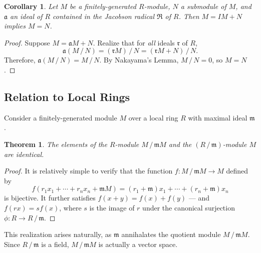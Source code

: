 \documentclass[11pt]{article}
\newtheorem{theorem}{Theorem}
\newtheorem{corollary}{Corollary}
\begin{document}
\begin{adjustwidth}{1cm}{}
	\begin{corollary}
		Let $M$ be a finitely-generated $R$-module, $N$ a submodule of $M$, and $\mathfrak{a}$ an ideal of $R$ contained in the Jacobson radical $\mathfrak{R}$ of $R$. Then $M = IM + N$ implies $M = N$.
	\end{corollary}
	\begin{proof}
		Suppose $M = \mathfrak{a} M + N$. Realize that for \textit{all} ideals $\mathfrak{r}$ of $R$,
		\[
			\mathfrak{a}(M \,/\, N) = (\mathfrak{r}M) \,/\, N = (\mathfrak{r}M + N) \,/\, N.
		\]
		Therefore, $\mathfrak{a}(M \,/\, N) = M \,/\, N$. By Nakayama's Lemma, $M \,/\, N = 0$, so $M = N$.
	\end{proof}
\end{adjustwidth}


\subsection{Relation to Local Rings}

Consider a finitely-generated module $M$ over a local ring $R$ with maximal ideal $\mathfrak{m}$. 

\begin{adjustwidth}{1cm}{}
	\begin{theorem}
		The elements of the $R$-module $M \,/\, \mathfrak{m} M$ and the $(R \,/\, \mathfrak{m})$-module $M$ are identical.
	\end{theorem}
	\begin{proof}
		It is relatively simple to verify that the function $f : M \,/\, \mathfrak{m} M \to M$ defined by
		\[
			f(r_{1} x_{1} + \cdots + r_{n} x_{n} + \mathfrak{m}M) = (r_{1} + \mathfrak{m})x_{1} + \cdots + (r_{n} + \mathfrak{m})x_{n}
		\]
		is bijective. It further satisfies $f(x + y) = f(x) + f(y)$ --- and $f(rx) = s f(x)$, where $s$ is the image of $r$ under the canonical surjection $\phi : R \to R \,/\, \mathfrak{m}$.
	\end{proof}
\end{adjustwidth}

This realization arises naturally, as $\mathfrak{m}$ annihalates the quotient module $M \,/\, \mathfrak{m} M$. Since $R \,/\, \mathfrak{m}$ is a field, $M \,/\, \mathfrak{m} M$ is actually a vector space.
\end{document}
